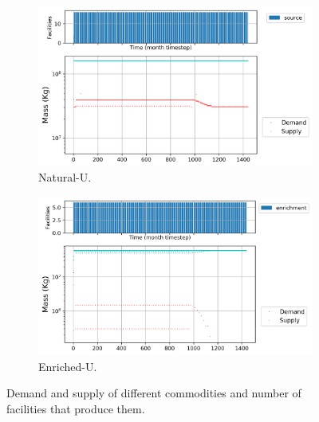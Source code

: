 \documentclass[11pt]{article}
\begin{document}
\begin{figure}[H]
	\centering
	\begin{subfigure}[]{0.45\textwidth}
		\centering
		\includegraphics[width=\linewidth]{23-figures/0-poly-sourceout.png} 
		\caption{Natural-U.}
		\label{fig:23-sourceout}
	\end{subfigure}
	\vspace{1cm}
	\begin{subfigure}[]{0.45\textwidth}
		\centering
		\includegraphics[width=\linewidth]{23-figures/0-poly-enrichmentout.png} 
		\caption{Enriched-U.}
		\label{fig:23-enrichmentout}
	\end{subfigure}
	\hfill
	\caption{Demand and supply of different commodities and number of facilities that produce them.}
	\label{fig:23-front}
\end{figure}
\end{document}
